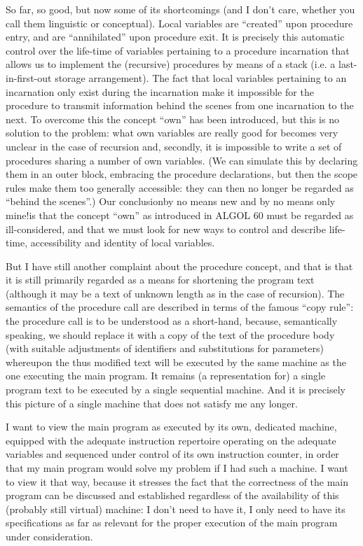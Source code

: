 So far, so good, but now some of its shortcomings (and I don't care, whether you call them linguistic or conceptual). Local variables are ``created'' upon procedure entry, and are ``annihilated'' upon procedure exit. It is precisely this automatic control over the life-time of variables pertaining to a procedure incarnation that allows us to implement the (recursive) procedures by means of a stack (i.e. a last-in-first-out storage arrangement). The fact that local variables pertaining to an incarnation only exist during the incarnation make it impossible for the procedure to transmit information behind the scenes from one incarnation to the next. To overcome this the concept ``own'' has been introduced, but this is no solution to the problem: what own variables are really good for becomes very unclear in the case of recursion and, secondly, it is impossible to write a set of procedures sharing a number of own variables. (We can simulate this by declaring them in an outer block, embracing the procedure declarations, but then the scope rules make them too generally accessible: they can then no longer be regarded as ``behind the scenes''.) Our conclusion\textemdash{}by no means new and by no means only mine!\textemdash{}is that the concept ``own'' as introduced in ALGOL 60 must be regarded as ill-considered, and that we must look for new ways to control and describe life-time, accessibility and identity of local variables.

But I have still another complaint about the procedure concept, and that is that it is still primarily regarded as a means for shortening the program text (although it may be a text of unknown length as in the case of recursion). The semantics of the procedure call are described in terms of the famous ``copy rule'': the procedure call is to be understood as a short-hand, because, semantically speaking, we should replace it with a copy of the text of the procedure body (with suitable adjustments of identifiers and substitutions for parameters) whereupon the thus modified text will be executed by the same machine as the one executing the main program. It remains (a representation for) a single program text to be executed by a single sequential machine. And it is precisely this picture of a single machine that does not satisfy me any longer.

I want to view the main program as executed by its own, dedicated machine, equipped with the adequate instruction repertoire operating on the adequate variables and sequenced under control of its own instruction counter, in order that my main program would solve my problem if I had such a machine. I want to view it that way, because it stresses the fact that  the correctness of the main program can be discussed and established regardless of the availability of this (probably still virtual) machine: I don't
need to have it, I only need to have its specifications as far as relevant for the proper execution of the main program under consideration.

